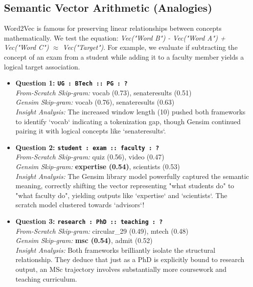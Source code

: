 \documentclass[11pt,a4paper]{article}
\begin{document}
\subsection{Semantic Vector Arithmetic (Analogies)}
Word2Vec is famous for preserving linear relationships between concepts mathematically. We test the equation: \textit{Vec("Word B") - Vec("Word A") + Vec("Word C") $\approx$ Vec("Target")}. For example, we evaluate if subtracting the concept of an exam from a student while adding it to a faculty member yields a logical target association.

\begin{analogyBox}
\begin{itemize}[leftmargin=*, parsep=0.8em]

    \item \textbf{Question 1: \texttt{UG : BTech :: PG : ?}} \\
    \textit{From-Scratch Skip-gram:} vocab (0.73), senateresults (0.51) \\
    \textit{Gensim Skip-gram:} vocab (0.76), senateresults (0.63) \\
    \textit{Insight Analysis:} The increased window length (10) pushed both frameworks to identify `vocab` indicating a tokenization gap, though Gensim continued pairing it with logical concepts like `senateresults`.

    \item \textbf{Question 2: \texttt{student : exam :: faculty : ?}} \\
    \textit{From-Scratch Skip-gram:} quiz (0.56), video (0.47) \\
    \textit{Gensim Skip-gram:} \textcolor{accentgreen}{\textbf{expertise (0.54)}}, scientists (0.53) \\
    \textit{Insight Analysis:} The Gensim library model powerfully captured the semantic meaning, correctly shifting the vector representing "what students do" to "what faculty do", yielding outputs like `expertise` and `scientists`. The scratch model clustered towards `advisors`!

    \item \textbf{Question 3: \texttt{research : PhD :: teaching : ?}} \\
    \textit{From-Scratch Skip-gram:} circular\_29 (0.49), mtech (0.48) \\
    \textit{Gensim Skip-gram:} \textcolor{accentgreen}{\textbf{msc (0.54)}}, admit (0.52) \\
    \textit{Insight Analysis:} Both frameworks brilliantly isolate the structural relationship. They deduce that just as a PhD is explicitly bound to research output, an MSc trajectory involves substantially more coursework and teaching curriculum.

\end{itemize}
\end{analogyBox}
\end{document}
